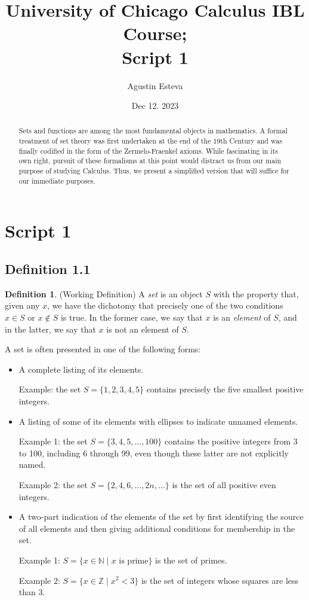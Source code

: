 \documentclass[openany, amssymb, psamsfonts]{amsart}
\title{University of Chicago Calculus IBL Course;\\ Script 1}
\author{Agustin Esteva}
\date{Dec 12. 2023}
\theoremstyle{definition}
\newtheorem{defn}{Definition}[section]
\numberwithin{equation}{section}
\begin{document}
\begin{abstract}
Sets and functions are among the most fundamental objects in mathematics.  A formal treatment
of set theory was first undertaken at the end of the 19th Century and was finally codified
in the form of the Zermelo-Fraenkel axioms.  While fascinating in its own right, pursuit of these
formalisms at this point would distract us from our main purpose of studying Calculus.  Thus, we
present a simplified version that will suffice for our immediate purposes.


\end{abstract}

\maketitle

\tableofcontents
\section{Script 1}
\subsection{Definition 1.1}
\begin{defn} (Working Definition)
A {\em set} is an object $S$ with the property that, given any $x$, we have the dichotomy that precisely
one of the two conditions $x\in S$ or $x\not\in S$ is true.  In the former case, we say that $x$ is an 
{\em element} of $S$, and in the latter, we say that $x$ is not an element of $S$.
\end{defn}


A set is often presented in one of the following forms:
\begin{itemize}
\item
A complete listing of its elements.

Example:  the set $S=\{1,2,3,4,5\}$ contains precisely the 
five smallest positive integers.


\item
A listing of some of its elements with ellipses to indicate unnamed elements.

Example 1:  the set $S=\{3, 4, 5, \ldots, 100\}$ contains the positive integers from 3 to 100,
including 6 through 99, even though these latter are not explicitly named.  


Example 2:  the set $S=\{2, 4, 6, \ldots, 2n, \ldots \}$ is the set of all positive even integers.


\item
A two-part indication of the elements of the set by first identifying the source of all elements
and then giving additional conditions for membership in the set.

Example 1: 
$S=\{x\in {\mathbb N}\mid \mbox{$x$ is prime}\}$ is the set of primes.  


Example 2:
$S=\{x\in {\mathbb Z}\mid \mbox{$x^2<3$}\}$ is the set of integers whose squares are less than 3.
\end{itemize}
\end{document}
